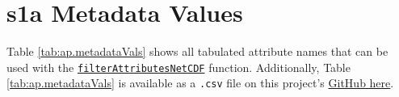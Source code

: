 
\chapter{\ac{s1a} Metadata Values}
\label{ap:metadata}

Table \ref{tab:ap.metadataVals} shows all tabulated attribute names that can be used with the \href{https://github.com/JNSRYA006/sar-parameter-extraction-pipeline/blob/main/functions/preprocess/filterAttributesNetCDF.m}{\lstinline{filterAttributesNetCDF}} function. Additionally, Table \ref{tab:ap.metadataVals} is available as a \texttt{.csv} file on this project's \href{https://github.com/JNSRYA006/sar-parameter-extraction-pipeline/blob/main/functions/preprocess/filterAttributesNetCDF.m}{GitHub here}.

